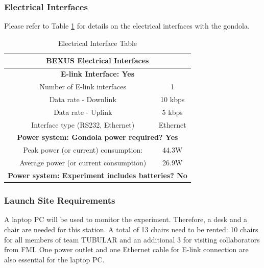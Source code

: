 \documentclass[a4paper,12pt,twoside]{article}
\begin{document}
\pagebreak
\subsubsection{Electrical Interfaces}

Please refer to Table \ref{tab:electrical-interface-table} for details on the electrical interfaces with the gondola.


\begin{table}[H]
\centering
\begin{tabular}{|c|c|c|}
\hline
\multicolumn{3}{|c|}{\textbf{BEXUS Electrical Interfaces}}                     \\ \hline
\multicolumn{3}{|c|}{\textbf{E-link Interface: Yes}}                           \\ \hline
\multirow{4}{*}{}    & Number of E-link interfaces               & 1           \\ \cline{2-3} 
                     & Data rate - Downlink                      & 10 kbps     \\ \cline{2-3} 
                     & Data rate - Uplink                        & 5 kbps      \\ \cline{2-3} 
                     & Interface type (RS232, Ethernet)          & Ethernet    \\ \hline
\multicolumn{3}{|c|}{\textbf{Power system: Gondola power required? Yes}}       \\ \hline
\multirow{2}{*}{}    & Peak power (or current) consumption:      & 44.3W            \\ \cline{2-3} 
                     & Average power (or current consumption)    & 26.9W            \\ \hline
\multicolumn{3}{|l|}{\textbf{Power system: Experiment includes batteries? No}} \\ \hline
\end{tabular}
\caption{Electrical Interface Table}
\label{tab:electrical-interface-table}
\end{table}
\raggedbottom

\subsubsection{Launch Site Requirements}
A laptop PC will be used to monitor the experiment. Therefore, a desk and a chair are needed for this station. A total of 13 chairs need to be rented: 10 chairs for all members of team TUBULAR and an additional 3 for visiting collaborators from FMI. One power outlet and one Ethernet cable for E-link connection are also essential for the laptop PC.
\end{document}
